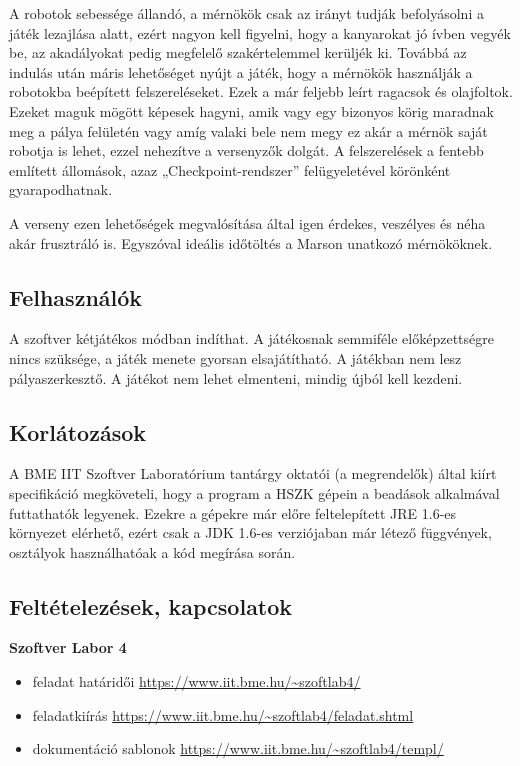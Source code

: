 A robotok sebessége állandó, a mérnökök csak az irányt tudják befolyásolni a játék lezajlása alatt, ezért nagyon kell figyelni, hogy a kanyarokat jó ívben vegyék be, az akadályokat pedig megfelelő szakértelemmel kerüljék ki. Továbbá az indulás után máris lehetőséget nyújt a játék, hogy a mérnökök használják a robotokba beépített felszereléseket. Ezek a már feljebb leírt ragacsok és olajfoltok. Ezeket maguk mögött képesek hagyni, amik vagy egy bizonyos körig maradnak meg a pálya felületén vagy amíg valaki bele nem megy ez akár a mérnök saját robotja is lehet, ezzel nehezítve a versenyzők dolgát. A felszerelések a fentebb említett állomások, azaz „Checkpoint-rendszer” felügyeletével körönként gyarapodhatnak.

A verseny ezen lehetőségek megvalósítása által igen érdekes, veszélyes és néha akár frusztráló is. Egyszóval ideális időtöltés a Marson unatkozó mérnököknek.

\subsection{Felhasználók}
A szoftver kétjátékos módban indíthat. A játékosnak semmiféle előképzettségre nincs szüksége, a játék menete gyorsan elsajátítható. A játékban nem lesz pályaszerkesztő. A játékot nem lehet elmenteni, mindig újból kell kezdeni.

\subsection{Korlátozások}
A BME IIT Szoftver Laboratórium tantárgy oktatói (a megrendelők) által kiírt specifikáció megköveteli, hogy a program a HSZK gépein a beadások alkalmával futtathatók legyenek. Ezekre a gépekre már előre feltelepített JRE 1.6-es környezet elérhető, ezért csak a JDK 1.6-es verziójaban már létező függvények, osztályok használhatóak a kód megírása során.


\subsection{Feltételezések, kapcsolatok}
\textbf{Szoftver Labor 4}
\begin{itemize}
\item feladat határidői \url{https://www.iit.bme.hu/~szoftlab4/}
\item feladatkiírás \url{https://www.iit.bme.hu/~szoftlab4/feladat.shtml}
\item dokumentáció sablonok \url{https://www.iit.bme.hu/~szoftlab4/templ/}
\end{itemize}


